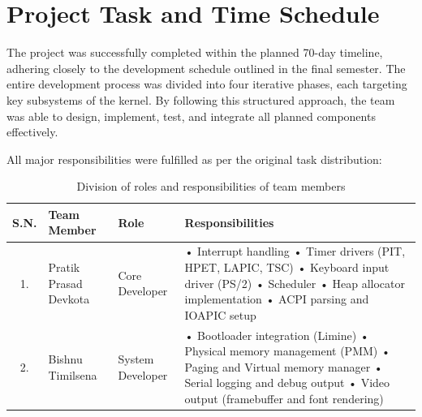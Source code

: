 \documentclass[12pt]{extarticle}
\begin{document}
\pagebreak

\section{Project Task and Time Schedule}
The project was successfully completed within the planned 70-day timeline, adhering closely to the development schedule outlined in the final semester. The entire development process was divided into four iterative phases, each targeting key subsystems of the kernel. By following this structured approach, the team was able to design, implement, test, and integrate all planned components effectively.

All major responsibilities were fulfilled as per the original task distribution:


\begin{table}[H]
    \centering
    \begin{tabular}{|c|p{3.5cm}|p{3cm}|p{7cm}|}
        \hline
        \textbf{S.N.} & \textbf{Team Member} & \textbf{Role} & \textbf{Responsibilities} \\
        \hline
        1. & Pratik Prasad Devkota & Core Developer & 
        • Interrupt handling \vspace{6pt} \newline
        • Timer drivers (PIT, HPET, LAPIC, TSC) \vspace{6pt} \newline
        • Keyboard input driver (PS/2) \vspace{6pt} \newline
        • Scheduler \vspace{6pt} \newline
        • Heap allocator implementation \vspace{6pt} \newline
        • ACPI parsing and IOAPIC setup \\
        \hline
        2. & Bishnu Timilsena & System Developer & 
        • Bootloader integration (Limine) \vspace{6pt} \newline
        • Physical memory management (PMM) \vspace{6pt} \newline
        • Paging and Virtual memory manager \vspace{6pt} \newline
        • Serial logging and debug output \vspace{6pt} \newline
        • Video output (framebuffer and font rendering) \\
        \hline
    \end{tabular}
    \caption{Division of roles and responsibilities of team members}
    \label{tab:workload}
\end{table}
\end{document}
